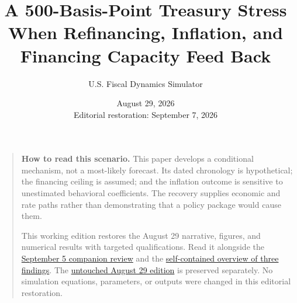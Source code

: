 \documentclass[11pt]{article}
\title{A 500-Basis-Point Treasury Stress\\
\large When Refinancing, Inflation, and Financing Capacity Feed Back}
\author{U.S. Fiscal Dynamics Simulator}
\date{August 29, 2026\\\small Editorial restoration: September 7, 2026}
\begin{document}
\maketitle

\begin{quote}
\small
\textbf{How to read this scenario.} This paper develops a conditional mechanism,
not a most-likely forecast. Its dated chronology is hypothetical; the financing
ceiling is assumed; and the inflation outcome is sensitive to unestimated
behavioral coefficients. The recovery supplies economic and rate paths rather
than demonstrating that a policy package would cause them.

This working edition restores the August 29 narrative, figures, and numerical
results with targeted qualifications. Read it alongside the
\href{confidence_shock_review.pdf}{September 5 companion review} and the
\href{continuing_to_borrow.pdf}{self-contained overview of three findings}.
The \href{confidence_shock_household_scenario_2026-08-29.pdf}{untouched August 29 edition}
is preserved separately. No simulation equations, parameters, or outputs were
changed in this editorial restoration.
\end{quote}
\end{document}
